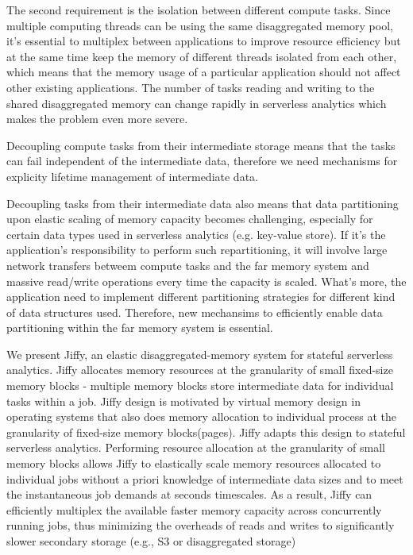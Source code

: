  The second requirement is the isolation between different compute tasks. Since multiple computing threads can be using the same disaggregated memory pool, it's essential to multiplex between applications to improve resource efficiency but at the same time keep the memory of different threads isolated from each other, which means that the memory usage of a particular application should not affect other existing applications. The number of tasks reading and writing to the shared disaggregated memory can change rapidly in serverless analytics which makes the problem even more severe.

Decoupling compute tasks from their intermediate storage means that the tasks can fail independent of the intermediate data, therefore we need mechanisms for explicity lifetime management of intermediate data.

Decoupling tasks from their intermediate data also means that data partitioning upon elastic scaling of memory capacity becomes challenging, especially for certain data types used in serverless analytics (e.g. key-value store). If it's the application's responsibility to perform such repartitioning, it will involve large network transfers betweem compute tasks and the far memory system and massive read/write operations every time the capacity is scaled. What's more, the application need to implement different partitioning strategies for different kind of data structures used. Therefore, new mechansims to efficiently enable data partitioning within the far memory system is essential.


We present Jiffy, an elastic disaggregated-memory system for stateful serverless analytics. Jiffy allocates memory resources at the granularity of small fixed-size memory blocks - multiple memory blocks store intermediate data for individual tasks within a job. Jiffy design is motivated by virtual memory design in operating systems that also does memory allocation to individual process at the granularity of fixed-size memory blocks(pages). Jiffy adapts this design to stateful serverless analytics. Performing resource allocation at the granularity of small memory blocks allows Jiffy to elastically scale memory resources allocated to individual jobs without a priori knowledge of intermediate data sizes and to meet the instantaneous job demands at seconds timescales. As a result, Jiffy can efficiently multiplex the available faster memory capacity across concurrently running jobs, thus minimizing the overheads of reads and writes to significantly slower secondary storage (e.g., S3 or disaggregated storage)


